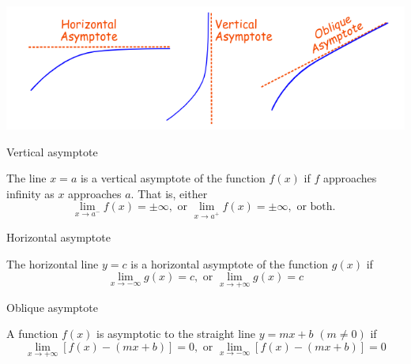 \documentclass[12pt]{article}
\begin{document}
\begin{center}
    \includegraphics[scale=0.4]{Types of asymptotes.png}
\end{center}

\begin{definition}{Vertical asymptote}
    
    The line $x=a$ is a vertical asymptote of the function $f(x)$ if $f$ approaches infinity as $x$ approaches $a$. That is, either \[
        \lim_{x \to a^-} f(x) = \pm \infty, \text{ or } \lim_{x \to a^+} f(x) = \pm \infty, \text{ or both. }
    \]
\end{definition}
\begin{definition}{Horizontal asymptote}

    The horizontal line $y=c$ is a horizontal asymptote of the function $g(x)$ if \[
        \lim_{x \to -\infty} g(x) = c, \text{ or } \lim_{x \to +\infty} g(x) = c
    \]
\end{definition}
\begin{definition}{Oblique asymptote}

    A function $f(x)$ is asymptotic to the straight line $y=mx+b$ $(m \neq 0)$ if \[
        \lim_{x \to +\infty} [ f(x) - (mx+b) ] = 0, \text{ or } \lim_{x \to -\infty} [ f(x) - (mx+b) ] = 0
    \]
\end{definition}
\end{document}
